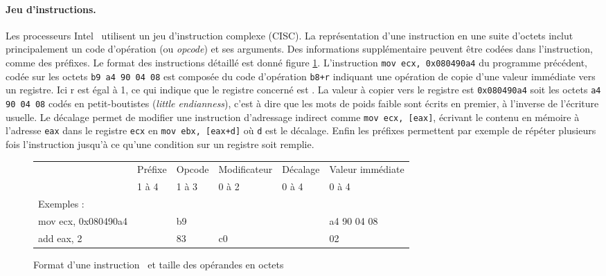 \paragraph{Jeu d'instructions.}
Les processeurs Intel \xq\ utilisent un jeu d'instruction complexe (CISC). La représentation d'une instruction en une suite d'octets inclut principalement un code d'opération (ou \emph{opcode}) et ses arguments. Des informations supplémentaire peuvent être codées dans l'instruction, comme des préfixes. Le format des instructions détaillé est donné figure \ref{fig:format_insts_x86}.
L'instruction \texttt{mov ecx, 0x080490a4} du programme précédent, codée sur les octets \texttt{b9 a4 90 04 08} est composée du code d'opération \texttt{b8+r} indiquant une opération de copie d'une valeur immédiate vers un registre. Ici r est égal à 1, ce qui indique que le registre concerné est \ecx. La valeur à copier vers le registre est \texttt{0x080490a4} soit les octets \texttt{a4 90 04 08} codés en petit-boutistes (\emph{little endianness}), c'est à dire que les mots de poids faible sont écrits en premier, à l'inverse de l'écriture usuelle.
Le décalage permet de modifier une instruction d'adressage indirect comme \texttt{mov ecx, [eax]}, écrivant le contenu en mémoire à l'adresse \texttt{eax} dans le registre \texttt{ecx} en \texttt{mov ebx, [eax+d]} où \texttt{d} est le décalage.
Enfin les préfixes permettent par exemple de répéter plusieurs fois l'instruction jusqu'à ce qu'une condition sur un registre soit remplie.

\begin{figure}[h]
\begin{center} 
\begin{tabular}{l|l|l|l|l|l|}
\cline{2-6}
& Préfixe & Opcode & Modificateur & Décalage & Valeur immédiate \\
& 1 à 4 & 1 à 3 & 0 à 2 & 0 à 4 & 0 à 4\\
\cline{2-6}
\multicolumn{1}{l}{Exemples :} & \multicolumn{5}{l}{}\\
\hline
\multicolumn{1}{|l|}{mov ecx, 0x080490a4} & & b9 & & & a4 90 04 08 \\
\multicolumn{1}{|l|}{add eax, 2} & & 83 & c0 & & 02 \\
\hline
\end{tabular}
\end{center} 
\caption{Format d'une instruction \xq\ et taille des opérandes en octets}
\label{fig:format_insts_x86}
\end{figure}

